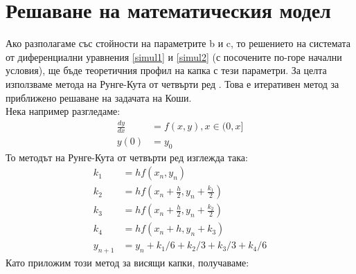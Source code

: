 \documentclass{article}
\begin{document}
\section{Решаване на математическия модел}
Ако разполагаме със стойности на параметрите b и c, то решението на системата от диференциални уравнения \eqref{simul1} и \eqref{simul2} (с посочените по-горе начални условия), ще бъде теоретичния профил на капка с тези параметри. За целта използваме метода на Рунге-Кута от четвърти ред \cite{runge-kutta}. Това е итеративен метод за приближено решаване на задачата на Коши.\\
Нека например разгледаме:
\begin{align*}
    \frac{dy}{dx} &= f(x, y), x \in {(0,x]}\\
    y(0) &= y_0
\end{align*}
То методът на Рунге-Кута от четвърти ред изглежда така:
\begin{align*}
    k_1 &= hf(x_n, y_n)\\
    k_2 &= hf(x_n + \frac{h}{2}, y_n + \frac{k_1}{2})\\
    k_3 &= hf(x_n + \frac{h}{2}, y_n + \frac{k_2}{2})\\
    k_4 &= hf(x_n + h, y_n + k_3)\\
    y_{n+1} &= y_n + k_1/6 + k_2/3 + k_3/3 + k_4/6
\end{align*}
Като приложим този метод за висящи капки, получаваме:
\end{document}
